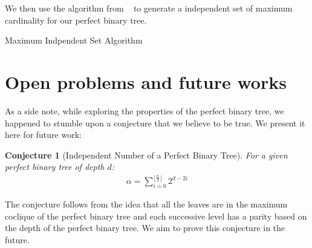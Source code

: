 \documentclass{amsart}
\newtheorem{conj}{Conjecture}[section]
\theoremstyle{definition}
\begin{document}
We then use the algorithm from ~\cite{Niskanen2003CliquerUG} to generate a independent set of maximum cardinality for our perfect binary tree.

\begin{algorithm}[hbt!]
  \caption{Maximum Indpendent Set Algorithm}\label{alg:max-independent-set}


\end{algorithm}


\newpage

\section{Open problems and future works}\label{future}

As a side note, while exploring the properties of the perfect binary tree, we happened to stumble upon a conjecture that we believe to be true. We present it here for future work:

\begin{conj}[Independent Number of a Perfect Binary Tree]
  For a given perfect binary tree of depth $d$:
  \begin{align*}
    \alpha = \displaystyle\sum_{i = 0}^{\lfloor\frac{n}{2}\rfloor} 2^{d - 2i}
  \end{align*}
\end{conj}

The conjecture follows from the idea that all the leaves are in the maximum coclique of the perfect binary tree and each successive level has a parity based on the depth of the perfect binary tree. We aim to prove this conjecture in the future.






\end{document}
